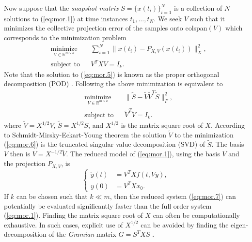 Now suppose that the \emph{snapshot matrix} $S=\{x(t_i)\}_{i=1}^N$ is a collection of $N$ solutions to (\ref{eq:mor.1}) at time instances $t_1,\dots,t_N$. We seek $V$ such that it minimizes the collective projection error of the samples onto colspan$(V)$ which corresponds to the minimization problem
\begin{equation} \label{eq:mor.5}
\begin{aligned}
& \underset{V\in \mathbb{R}^{m\times k}}{\text{minimize}}
& & \sum_{i=1}^N \| x(t_i) - P_{X,V}( x(t_i) ) \|_X^2, \\
& \text{subject to}
& & V^TXV = I_k.
\end{aligned}
\end{equation}
Note that the solution to (\ref{eq:mor.5}) is known as the proper orthogonal decomposition (POD) \cite{hesthaven2015certified,quarteroni2015reduced,gubisch2017proper}. Following \cite{quarteroni2015reduced} the above minimization is equivalent to
\begin{equation} \label{eq:mor.6}
\begin{aligned}
& \underset{V\in \mathbb{R}^{m\times k}}{\text{minimize}}
& & \| \tilde S - \tilde V \tilde V^T \tilde S \|_F^2, \\
& \text{subject to}
& & \tilde V^T\tilde V = I_k.
\end{aligned}
\end{equation}
where $\tilde V = X^{1/2} V$, $\tilde S = X^{1/2} S$, and $X^{1/2}$ is the matrix square root of $X$. According to Schmidt-Mirsky-Eckart-Young theorem \cite{Markovsky:2011:LRA:2103589} the solution $\tilde V$ to the minimization (\ref{eq:mor.6}) is the truncated singular value decomposition (SVD) of $\tilde S$. The basis $V$ then is $V = X^{-1/2}\tilde V$. The reduced model of (\ref{eq:mor.1}), using the basis $V$ and the projection $P_{X,V}$, is
\begin{equation} \label{eq:mor.7}
	\left\{
	\begin{aligned}
	\dot y(t) &= V^TX f(t,Vy), \\
	y(0) &= V^TX x_0.
	\end{aligned}
	\right.
\end{equation}
If $k$ can be chosen such that $k \ll m$, then the reduced system (\ref{eq:mor.7}) can potentially be evaluated significantly faster than the full order system (\ref{eq:mor.1}). Finding the matrix square root of $X$ can often be computationally exhaustive. In such cases, explicit use of $X^{1/2}$ can be avoided by finding the eigen-decomposition of the \emph{Gramian} matrix $G = S^TXS$ \cite{quarteroni2015reduced,Haasdonk2017}.

